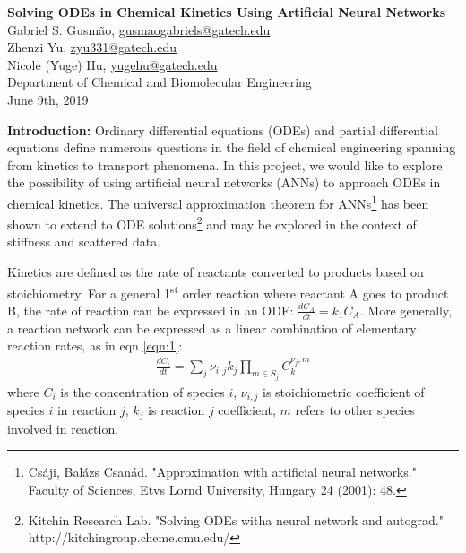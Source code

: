 \documentclass[10pt]{article}
\begin{document}
\begin{center}
    \large \textbf{Solving ODEs in Chemical Kinetics Using Artificial Neural Networks \\}
    \vspace{0.5em}
    \normalsize Gabriel S. Gusm\~{a}o\textsuperscript{\textdagger},
    \href{mailto:gusmaogabriels@gatech.edu}{gusmaogabriels@gatech.edu}\\ 
    Zhenzi Yu\textsuperscript{\textdagger}, 
    \href{mailto:zyu331@gatech.edu}{zyu331@gatech.edu}\\
    Nicole (Yuge) Hu\textsuperscript{\textdagger}, 
    \href{mailto:yugehu@gatech.edu}{yugehu@gatech.edu}\\
    \vspace{0.2em}
    \textsuperscript{\textdagger}Department of Chemical and Biomolecular Engineering\\
    \vspace{0.2em}
    June 9th, 2019 \\
\end{center}

\textbf{Introduction: }Ordinary differential equations (ODEs) and partial differential equations define numerous questions in the field of chemical engineering spanning from kinetics to transport phenomena. In this project, we would like to explore the possibility of using artificial neural networks (ANNs) to approach ODEs in chemical kinetics. The universal approximation theorem for ANNs\footnote{Csáji, Balázs Csanád. "Approximation with artificial neural networks." Faculty of Sciences, Etvs Lornd University, Hungary 24 (2001): 48.} has been shown to extend to ODE solutions\footnote{Kitchin Research Lab. "Solving ODEs witha neural network and autograd." http://kitchingroup.cheme.cmu.edu/} and may be explored in the context of stiffness and scattered data.

\vspace{0.2em}

Kinetics are defined as the rate of reactants converted to products based on stoichiometry. For a general 1\textsuperscript{st} order reaction  where reactant A goes to product B, the rate of reaction can be expressed in an ODE: $\frac{dC_A}{dt} = k_{1} C_A$. More generally, a reaction network can be expressed as a linear combination of elementary reaction rates, as in eqn \ref{eqn:1}:
\begin{align}
    \frac{dC_i}{dt} = \sum_{j}\nu_{i,j}k_{j}\prod_{m\in S_j} C_{k}^{\nu_j,m}
    \label{eqn:1}
\end{align}
 where $C_i$ is the concentration of species $i$, $\nu_{i,j}$ is stoichiometric coefficient of species $i$ in reaction $j$, $k_j$ is reaction $j$ coefficient, $m$ refers to other species involved in reaction. 
 
\end{document}
